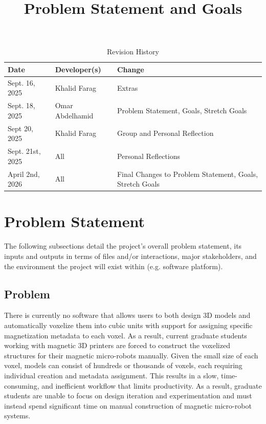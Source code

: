 \documentclass{article}
\title{Problem Statement and Goals\\\progname}
\author{\authname}
\date{}
\begin{document}
\maketitle

\begin{table}[hp]
\caption{Revision History} \label{TblRevisionHistory}
\begin{tabularx}{\textwidth}{llX}
\toprule
\textbf{Date} & \textbf{Developer(s)} & \textbf{Change}\\
\midrule
Sept. 16, 2025 & Khalid Farag & Extras\\
Sept. 18, 2025 & Omar Abdelhamid & Problem Statement, Goals, Stretch Goals\\
Sept 20, 2025 & Khalid Farag & Group and Personal Reflection\\
Sept. 21st, 2025 & All & Personal Reflections\\
April 2nd, 2026 & All & Final Changes to Problem Statement, Goals, Stretch Goals\\
\bottomrule
\end{tabularx}
\end{table}

\section{Problem Statement}
The following subsections detail the project's overall problem statement, its inputs and outputs in terms of 
files and/or interactions, major stakeholders, and the environment the project will exist within (e.g. 
software platform).

\subsection{Problem}
There is currently no software that allows users to both design 3D models and automatically voxelize them into cubic units with support for assigning specific magnetization metadata to each voxel. As a result, current graduate students working with magnetic 3D printers are forced to construct the voxelized structures for their magnetic micro-robots manually. Given the small size of each voxel, models can consist of hundreds or thousands of voxels, each requiring individual creation and metadata assignment. This results in a slow, time-consuming, and inefficient workflow that limits productivity. As a result, graduate students are unable to focus on design iteration and experimentation and must instead spend significant time on manual construction of magnetic micro-robot systems.
\end{document}
